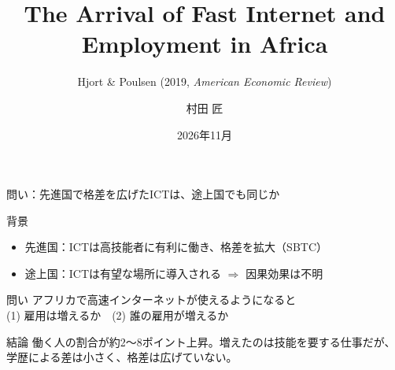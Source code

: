 \documentclass[aspectratio=169,11pt]{beamer}
\title{The Arrival of Fast Internet and Employment in Africa}
\subtitle{Hjort \& Poulsen (2019, \textit{American Economic Review})}
\author{村田 匠}
\institute{因果推論 発表}
\date{2026年11月}
\begin{document}
\begin{frame}
  \titlepage
\end{frame}

\begin{frame}{問い：先進国で格差を広げたICTは、途上国でも同じか}
  \begin{block}{背景}
    \begin{itemize}
      \item 先進国：ICTは\alert{高技能者に有利}に働き、格差を拡大（SBTC）
      \item 途上国：ICTは有望な場所に導入される $\Rightarrow$ \alert{因果効果は不明}
    \end{itemize}
  \end{block}
  \vspace{0.4em}
  \begin{block}{問い}
    アフリカで高速インターネットが使えるようになると\\
    (1) 雇用は増えるか　(2) 誰の雇用が増えるか
  \end{block}
  \vspace{0.8em}
    \begin{block}{結論}
    働く人の割合が約2〜8ポイント上昇。増えたのは技能を要する仕事だが、学歴による差は小さく、格差は広げていない。
  \end{block}
\end{frame}
\end{document}
